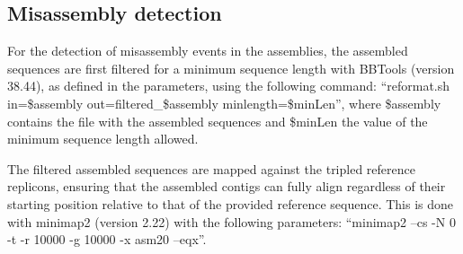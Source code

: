 \subsection{Misassembly detection}

For the detection of misassembly events in the assemblies, the assembled sequences are first filtered for a minimum sequence length with BBTools \cite{bushnell_bbmerge_2017} (version 38.44), as defined in the parameters, using the following command: “reformat.sh in=\$assembly out=filtered\_\$assembly minlength=\$minLen”, where \$assembly contains the file with the assembled sequences and \$minLen the value of the minimum sequence length allowed. 

The filtered assembled sequences are mapped against the tripled reference replicons, ensuring that the assembled contigs can fully align regardless of their starting position relative to that of the provided reference sequence. This is done with minimap2 \cite{li_minimap2_2018} (version 2.22) with the following parameters: “minimap2 --cs -N 0 -t -r 10000 -g 10000 -x asm20 --eqx”.

